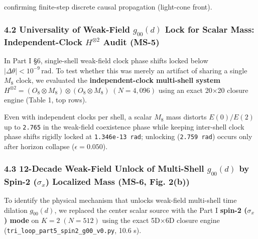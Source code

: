 \documentclass[
  a4paper,
]{article}
\begin{document}
confirming finite-step discrete causal propagation (light-cone front).

\subsubsection{\texorpdfstring{4.2 Universality of Weak-Field
\(g_{00}(d)\) Lock for Scalar Mass: Independent-Clock \(H^{\otimes 2}\)
Audit
(MS-5)}{4.2 Universality of Weak-Field g\_\{00\}(d) Lock for Scalar Mass: Independent-Clock H\^{}\{\textbackslash otimes 2\} Audit (MS-5)}}\label{universality-of-weak-field-g_00d-lock-for-scalar-mass-independent-clock-hotimes-2-audit-ms-5}

In Part I §6, single-shell weak-field clock phase shifts locked below
\(|\Delta\theta| < 10^{-9}\,\mathrm{rad}\). To test whether this was
merely an artifact of sharing a single \(M_8\) clock, we evaluated the
\textbf{independent-clock multi-shell system
\(H^{\otimes 2} = (O_8\otimes M_8)\otimes (O_8\otimes M_8)\;(N=4{,}096)\)}
using an exact 20×20 closure engine (Table 1, top rows).

Even with independent clocks per shell, a scalar \(M_8\) mass distorts
\(E(0)/E(2)\) up to \texttt{2.765} in the weak-field coexistence phase
while keeping inter-shell clock phase shifts rigidly locked at
\texttt{1.346e-13\ rad}; unlocking (\texttt{2.759\ rad}) occurs only
after horizon collapse (\(\epsilon = 0.050\)).

\subsubsection{\texorpdfstring{4.3 12-Decade Weak-Field Unlock of
Multi-Shell \(g_{00}(d)\) by Spin-2 (\(\sigma_x\)) Localized Mass (MS-6,
Fig.
2(b))}{4.3 12-Decade Weak-Field Unlock of Multi-Shell g\_\{00\}(d) by Spin-2 (\textbackslash sigma\_x) Localized Mass (MS-6, Fig. 2(b))}}\label{decade-weak-field-unlock-of-multi-shell-g_00d-by-spin-2-sigma_x-localized-mass-ms-6-fig.-2b}

To identify the physical mechanism that unlocks weak-field multi-shell
time dilation \(g_{00}(d)\), we replaced the center scalar source with
the Part I \textbf{spin-2 (\(\sigma_x\)) mode} on \(K=2\;(N=512)\) using
the exact 5D×6D closure engine
(\texttt{tri\_loop\_part5\_spin2\_g00\_v0.py}, 10.6 s).
\end{document}
